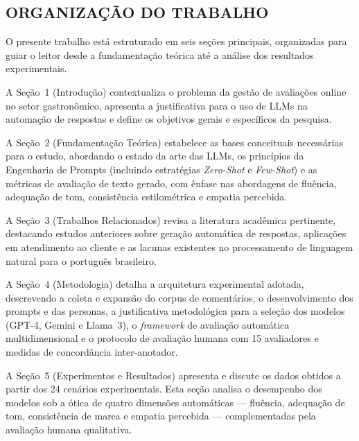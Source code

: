 
\subsection{ORGANIZAÇÃO DO TRABALHO}

O presente trabalho está estruturado em seis seções principais, organizadas para guiar o leitor desde a fundamentação teórica até a análise dos resultados experimentais.

A Seção~1 (Introdução) contextualiza o problema da gestão de avaliações online no setor gastronômico, apresenta a justificativa para o uso de LLMs na automação de respostas e define os objetivos gerais e específicos da pesquisa.

A Seção~2 (Fundamentação Teórica) estabelece as bases conceituais necessárias para o estudo, abordando o estado da arte das LLMs, os princípios da Engenharia de Prompts (incluindo estratégias \textit{Zero-Shot} e \textit{Few-Shot}) e as métricas de avaliação de texto gerado, com ênfase nas abordagens de fluência, adequação de tom, consistência estilométrica e empatia percebida.

A Seção~3 (Trabalhos Relacionados) revisa a literatura acadêmica pertinente, destacando estudos anteriores sobre geração automática de respostas, aplicações em atendimento ao cliente e as lacunas existentes no processamento de linguagem natural para o português brasileiro.

A Seção~4 (Metodologia) detalha a arquitetura experimental adotada, descrevendo a coleta e expansão do corpus de comentários, o desenvolvimento dos prompts e das personas, a justificativa metodológica para a seleção dos modelos (GPT-4, Gemini e Llama~3), o \textit{framework} de avaliação automática multidimensional e o protocolo de avaliação humana com 15 avaliadores e medidas de concordância inter-anotador.

A Seção~5 (Experimentos e Resultados) apresenta e discute os dados obtidos a partir dos 24 cenários experimentais. Esta seção analisa o desempenho dos modelos sob a ótica de quatro dimensões automáticas --- fluência, adequação de tom, consistência de marca e empatia percebida --- complementadas pela avaliação humana qualitativa.

